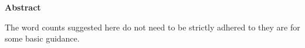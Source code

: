 \begin{center}
\LARGE\textbf {Abstract}
\end{center}
\vspace{5pt}

\noindent
The word counts suggested here do not need to be strictly adhered to they are for some basic guidance.
